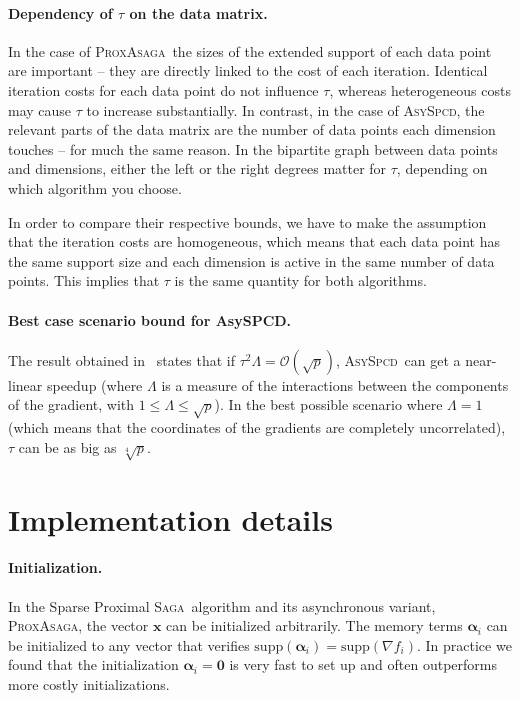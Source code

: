 \documentclass{article}
\newcommand{\PASAGA}{\textsc{ProxAsaga}}
\newcommand{\SAGA}{\textsc{Saga}}
\newcommand{\AsySPCD}{\textsc{AsySpcd}}
\def\xx{{\boldsymbol x}}
\def\balpha{{\boldsymbol \alpha}}
\begin{document}
\paragraph{Dependency of $\tau$ on the data matrix.}
In the case of \PASAGA\ the sizes of the extended support of each data point are important -- they are directly linked to the cost of each iteration.
Identical iteration costs for each data point do not influence $\tau$, whereas heterogeneous costs may cause $\tau$ to increase substantially.
In contrast, in the case of \AsySPCD, the relevant parts of the data matrix are the number of data points each dimension touches -- for much the same reason.
In the bipartite graph between data points and dimensions, either the left or the right degrees matter for $\tau$, depending on which algorithm you choose.

In order to compare their respective bounds, we have to make the assumption that the iteration costs are homogeneous, which means that each data point has the same support size and each dimension is active in the same number of data points. This implies that $\tau$ is the same quantity for both algorithms.

\paragraph{Best case scenario bound for AsySPCD.}
The result obtained in~\citet{liu2015asynchronous2} states that if $\tau^2 \Lambda = \mathcal{O}(\sqrt{p})$, \AsySPCD\ can get a near-linear speedup (where $\Lambda$ is a measure of the interactions between the components of the gradient, with $1 \leq \Lambda \leq \sqrt{p}$).
In the best possible scenario where $\Lambda = 1$ (which means that the coordinates of the gradients are completely uncorrelated), $\tau$ can be as big as $\sqrt[4]{p}$.



\clearpage

\section{Implementation details}\label{apx:implementation_details}


\paragraph{Initialization.} In the Sparse Proximal \SAGA\ algorithm and its asynchronous variant, \PASAGA, the vector $\xx$ can be initialized arbitrarily. The memory terms $\balpha_i$ can be initialized to any vector that verifies $\text{supp}(\balpha_i) = \text{supp}(\nabla f_i)$. In practice we found that the initialization $\balpha_i = \boldsymbol 0$ is very fast to set up and often outperforms more costly initializations.
\end{document}

